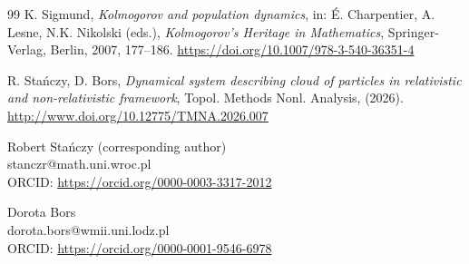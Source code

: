\documentclass[reqno,10pt]{article}
\theoremstyle{definition}
\numberwithin{equation}{section}
\numberwithin{theorem}{section}
\begin{document}
\begin{thebibliography}{99}
K. Sigmund,
\textit{Kolmogorov and population dynamics},
in: \'E. Charpentier,  A. Lesne, N.K. Nikolski (eds.),
\textit{Kolmogorov's Heritage in Mathematics},
Springer-Verlag, Berlin, 2007, 177--186.
\url{https://doi.org/10.1007/978-3-540-36351-4}

R. Stańczy, D. Bors,
\textit{Dynamical system describing cloud of particles in relativistic and non-relativistic framework},
Topol. Methods Nonl. Analysis, 
\textbf{} (2026).
\url{http://www.doi.org/10.12775/TMNA.2026.007}

\end{thebibliography}\bigskip


\noindent Robert Stańczy (corresponding author)\\%
stanczr@math.uni.wroc.pl\\
ORCID: \url{https://orcid.org/0000-0003-3317-2012} \bigskip %

\bigskip

\noindent Dorota Bors\\
dorota.bors@wmii.uni.lodz.pl\\
ORCID: \url{https://orcid.org/0000-0001-9546-6978} \bigskip

\bigskip
\end{document}
